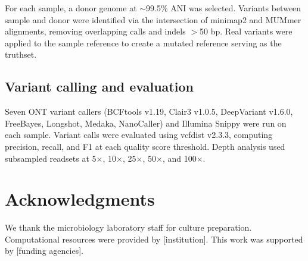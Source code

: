 \documentclass[11pt]{article}
\begin{document}
For each sample, a donor genome at $\sim$99.5\% ANI was selected. Variants between sample and donor were identified via the intersection of minimap2 and MUMmer alignments, removing overlapping calls and indels $>$50 bp. Real variants were applied to the sample reference to create a mutated reference serving as the truthset.

\subsection{Variant calling and evaluation}

Seven ONT variant callers (BCFtools v1.19, Clair3 v1.0.5, DeepVariant v1.6.0, FreeBayes, Longshot, Medaka, NanoCaller) and Illumina Snippy were run on each sample. Variant calls were evaluated using vcfdist v2.3.3, computing precision, recall, and F1 at each quality score threshold. Depth analysis used subsampled readsets at 5$\times$, 10$\times$, 25$\times$, 50$\times$, and 100$\times$.

\section{Acknowledgments}

We thank the microbiology laboratory staff for culture preparation. Computational resources were provided by [institution]. This work was supported by [funding agencies].



\end{document}
